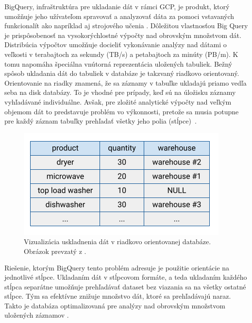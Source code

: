 BigQuery, infraštruktúra pre ukladanie dát v rámci GCP, je produkt, ktorý umožňuje jeho užívateľom spravovať a analyzovať dáta za pomoci vstavaných funkcionalít ako napríklad aj strojového učenia \cite{google-bq}. Dôležitou vlastnosťou Big Query je prispôsobenosť na vysokorýchlostné výpočty nad obrovským množstvom dát.
Distribúcia výpočtov umožňuje docieliť vykonávanie analýzy nad dátami o veľkosti v terabajtoch za sekundy (TB/s) a petabajtoch za minúty (PB/m).
K tomu napomáha špeciálna vnútorná reprezentácia uložených tabuliek. 
Bežný spôsob ukladania dát do tabuliek v databáze je takzvaný riadkovo orientovaný.
Orientovanie na riadky znamená, že sa záznamy v tabuľke ukladajú priamo vedľa seba na disk databázy.
To je vhodné pre prípady, keď sú na úložisku záznamy vyhľadávané individuálne.
Avšak, pre zložité analytické výpočty nad veľkým objemom dát to predstavuje problém vo výkonnosti, pretože sa musia potupne pre každý záznam tabuľky prehľadať všetky jeho polia \mbox{(stĺpce) \cite{google-bq-storage}}.

\begin{figure}[htb]
\begin{center}
 \includegraphics[scale=0.7]{obrazky-figures/row-oriented-store.png}
 \caption{Vizualizácia uskladnenia dát v riadkovo orientovanej databáze. Obrázok prevzatý z \cite{google-bq-storage}.}
 \label{img:row-oriented-store}
\end{center}
\end{figure}

Riešenie, ktorým BigQuery tento problém adresuje je použitie orientácie na jednotlivé stĺpce. 
Ukladaním dát v stĺpcovom formáte, a teda ukladaním každého stĺpca separátne umožňuje prehľadávať dataset bez viazania sa na všetky ostatné stĺpce.
Tým sa efektívne znižuje množstvo dát, ktoré sa prehľadávajú naraz.
Takto je databáza optimalizovaná pre analýzy nad obrovským množstvom uložených záznamov \cite{google-bq-storage}.

